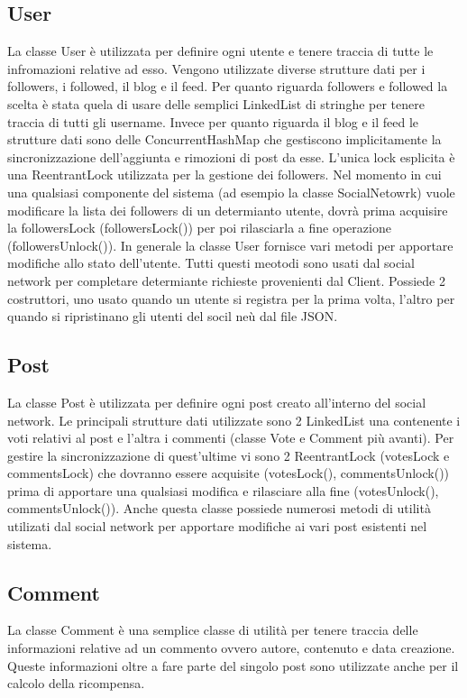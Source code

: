 \documentclass[11pt, a4paper, oneside]{article}
\begin{document}
\subsection{User}
La classe User è utilizzata per definire ogni utente e tenere traccia di tutte le infromazioni relative ad esso. Vengono utilizzate diverse strutture dati
per i followers, i followed, il blog e il feed. Per quanto riguarda followers e followed la scelta è stata quela di usare delle semplici LinkedList di stringhe
per tenere traccia di tutti gli username. Invece per quanto riguarda il blog e il feed le strutture dati sono delle ConcurrentHashMap che gestiscono implicitamente
la sincronizzazione dell'aggiunta e rimozioni di post da esse. L'unica lock esplicita è una ReentrantLock utilizzata per la gestione dei followers. Nel momento
in cui una qualsiasi componente del sistema (ad esempio la classe SocialNetowrk) vuole modificare la lista dei followers di un determianto utente, dovrà prima 
acquisire la followersLock (followersLock()) per poi rilasciarla a fine operazione (followersUnlock()).
In generale la classe User fornisce vari metodi per apportare modifiche allo stato dell'utente. Tutti questi meotodi sono usati dal social network per completare determiante
richieste provenienti dal Client. Possiede 2 costruttori, uno usato quando un utente si registra per la prima volta, l'altro per quando si ripristinano gli utenti 
del socil neù dal file JSON.
\subsection{Post}
La classe Post è utilizzata per definire ogni post creato all'interno del social network. Le principali strutture dati utilizzate sono 2 LinkedList una contenente 
i voti relativi al post e l'altra i commenti (classe Vote e Comment più avanti). Per gestire la sincronizzazione di quest'ultime vi sono 2 ReentrantLock (votesLock e commentsLock) che dovranno essere 
acquisite (votesLock(), commentsUnlock()) prima di apportare una qualsiasi modifica e rilasciare alla fine (votesUnlock(), commentsUnlock()). Anche questa classe 
possiede numerosi metodi di utilità utilizati dal social network per apportare modifiche ai vari post esistenti nel sistema. 
\subsection{Comment}
La classe Comment è una semplice classe di utilità per tenere traccia delle informazioni relative ad un commento ovvero autore, contenuto e data creazione.
Queste informazioni oltre a fare parte del singolo post sono utilizzate anche per il calcolo della ricompensa.
\end{document}
